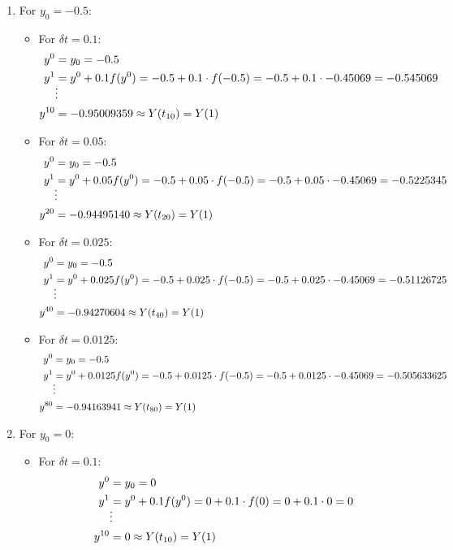 \documentclass[]{article}
\begin{document}
        \begin{enumerate}
      \item For $y_0 = -0.5$:
      \begin{itemize}
        \item For $\delta t = 0.1$:
        \begin{align*}
        y^0 &= y_0 = -0.5\\
        y^1 &= y^0 + 0.1f(y^0) = -0.5+0.1\cdot f(-0.5) = -0.5+0.1\cdot -0.45069 = -0.545069\\
             & \smash{\vdots} \\
        y^{10} &= -0.95009359 \approx Y(t_{10}) = Y(1)
        \end{align*}
        
    \item For $\delta t = 0.05$:
        \begin{align*}
        y^0 &= y_0 = -0.5\\
        y^1 &= y^0 + 0.05f(y^0) = -0.5+0.05\cdot f(-0.5) = -0.5+0.05\cdot -0.45069 = -0.5225345\\
             & \smash{\vdots} \\
        y^{20} &= -0.94495140   \approx Y(t_{20}) = Y(1)
        \end{align*}

    \item For $\delta t = 0.025$:
        \begin{align*}
        y^0 &= y_0 = -0.5\\
        y^1 &= y^0 + 0.025f(y^0) = -0.5+0.025\cdot f(-0.5) = -0.5+0.025\cdot -0.45069 = -0.51126725\\
             & \smash{\vdots} \\
        y^{40} &= -0.94270604 \approx Y(t_{40}) = Y(1)
        \end{align*}

    \item For $\delta t = 0.0125$:
        \begin{align*}
        y^0 &= y_0 = -0.5\\
        y^1 &= y^0 + 0.0125f(y^0) = -0.5+0.0125\cdot f(-0.5) = -0.5+0.0125\cdot -0.45069 = -0.505633625\\
             & \smash{\vdots} \\
        y^{80} &= -0.94163941  \approx Y(t_{80}) = Y(1)
        \end{align*}
      \end{itemize}

\item For $y_0 = 0$:
      \begin{itemize}
        \item For $\delta t = 0.1$:
        \begin{align*}
        y^0 &= y_0 = 0\\
        y^1 &= y^0 + 0.1f(y^0) = 0+0.1\cdot f(0) = 0+0.1\cdot 0 = 0\\
      & \smash{\vdots} \\
        y^{10} &= 0  \approx Y(t_{10}) = Y(1)
        \end{align*}
        

\end{itemize}
\end{enumerate}
\end{document}
